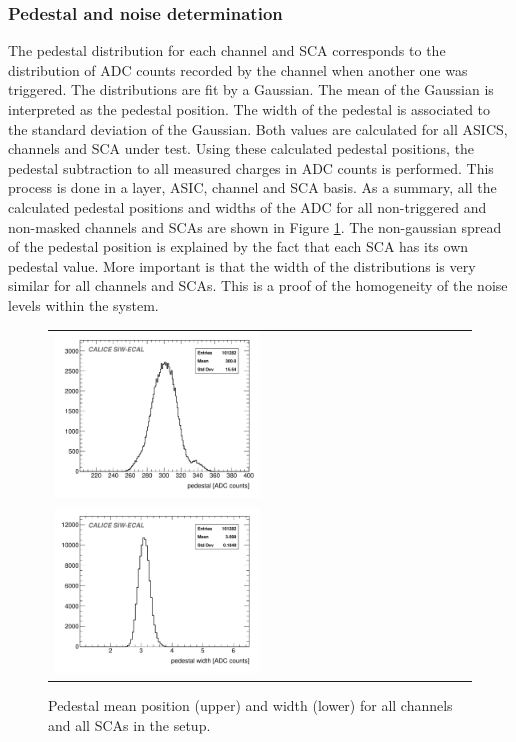 \documentclass[final,3p,times,twocolumn]{elsarticle}
\begin{document}
\subsubsection{Pedestal and noise determination}
\label{sec:pedestal}

The pedestal distribution for each channel and SCA corresponds to the
distribution of ADC counts recorded by the channel when another one was triggered.
The distributions are fit by a Gaussian. The mean of the Gaussian
is interpreted as the pedestal position. The width of the pedestal is associated to the 
standard deviation of the Gaussian.
Both values are calculated for all ASICS, channels and SCA under test.
Using these calculated pedestal positions, the pedestal subtraction to all measured charges in ADC counts is performed.
This process is done in a layer, ASIC, channel and SCA basis.
As a summary, all the calculated pedestal positions and widths of the ADC for all non-triggered and non-masked
channels and SCAs are shown in Figure \ref{pedestal_all}.
The non-gaussian spread of the pedestal position is explained by the fact that each SCA has its own pedestal value. More important is that the 
width of the distributions is very similar for all
channels and SCAs.
This is a proof of the homogeneity of the noise levels within the system.

\begin{figure}[h!t]
  \centering
  \begin{tabular}{l}
    \includegraphics[width=0.5\textwidth]{h_ped_mean_notitle-eps-converted-to.pdf} \\
    \includegraphics[width=0.5\textwidth]{h_ped_width_notitle-eps-converted-to.pdf}
  \end{tabular}
  \caption{Pedestal mean position (upper) and width (lower) for all channels and all SCAs in the setup.}
\label{pedestal_all}
\end{figure}
\end{document}
